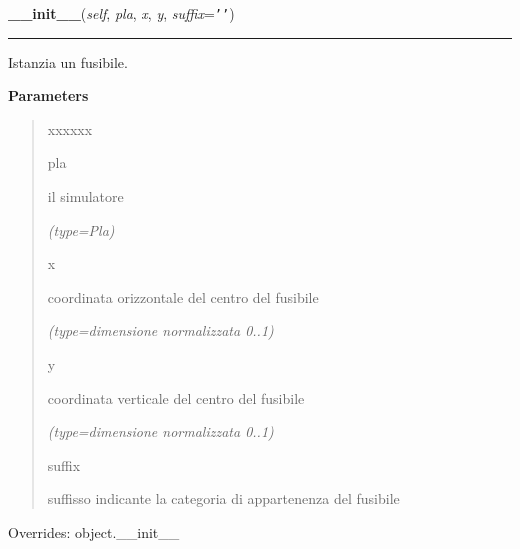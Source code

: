 \hspace{.8\funcindent}\begin{boxedminipage}{\funcwidth}

    \raggedright \textbf{\_\_init\_\_}(\textit{self}, \textit{pla}, \textit{x}, \textit{y}, \textit{suffix}={\tt \texttt{'}\texttt{}\texttt{'}})

    \vspace{-1.5ex}

    \rule{\textwidth}{0.5\fboxrule}
\setlength{\parskip}{2ex}
    Istanzia un fusibile.

\setlength{\parskip}{1ex}
      \textbf{Parameters}
      \vspace{-1ex}

      \begin{quote}
        \begin{Ventry}{xxxxxx}

          \item[pla]

          il simulatore

            {\it (type=Pla)}

          \item[x]

          coordinata orizzontale del centro del fusibile

            {\it (type=dimensione normalizzata 0..1)}

          \item[y]

          coordinata verticale del centro del fusibile

            {\it (type=dimensione normalizzata 0..1)}

          \item[suffix]

          suffisso indicante la categoria di appartenenza del fusibile

        \end{Ventry}

      \end{quote}

      Overrides: object.\_\_init\_\_

    \end{boxedminipage}

    \label{component:Fuse:toggle}

    \vspace{0.5ex}

